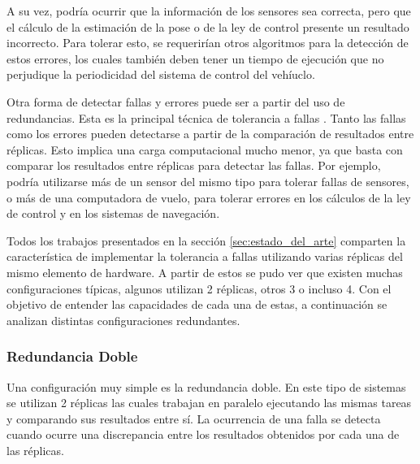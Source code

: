 A su vez, podría ocurrir que la información de los sensores sea correcta, pero que el cálculo de la estimación de la pose o de la ley de control presente un resultado incorrecto. Para tolerar esto, se requerirían otros algoritmos para la detección de estos errores, los cuales también deben tener un tiempo de ejecución que no perjudique la periodicidad del sistema de control del vehíuclo.

Otra forma de detectar fallas y errores puede ser a partir del uso de redundancias. Esta es la principal técnica de tolerancia a fallas \cite{lala1994architectural}.  Tanto las fallas como los errores pueden detectarse a partir de la comparación de resultados entre réplicas. Esto implica una carga computacional mucho menor, ya que basta con comparar los resultados entre réplicas para detectar las fallas.
Por ejemplo, podría utilizarse más de un sensor del mismo tipo para tolerar fallas de sensores, o más de una computadora de vuelo, para tolerar errores en los cálculos de la ley de control y en los sistemas de navegación.

Todos los trabajos presentados en la sección \ref{sec:estado_del_arte} comparten la característica de implementar la tolerancia a fallas utilizando varias réplicas del mismo elemento de hardware. A partir de estos se pudo ver que existen muchas configuraciones típicas, algunos utilizan 2 réplicas, otros 3 o incluso 4. Con el objetivo de entender las capacidades de cada una de estas, a continuación se analizan distintas configuraciones redundantes.

\subsubsection{Redundancia Doble}

Una configuración muy simple es la redundancia doble. En este tipo de sistemas se utilizan 2 réplicas las cuales trabajan en paralelo ejecutando las mismas tareas y comparando sus resultados entre sí. La ocurrencia de una falla se detecta cuando ocurre una discrepancia entre los resultados obtenidos por cada una de las réplicas.

